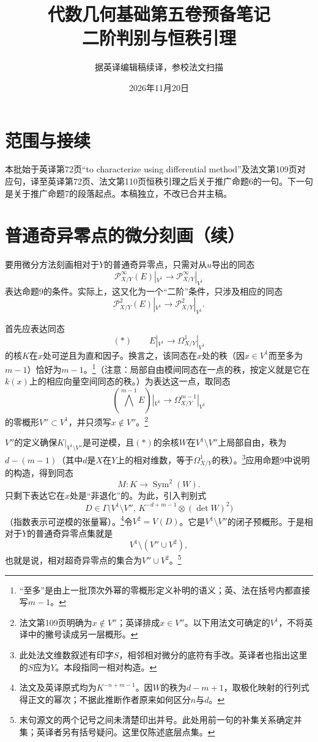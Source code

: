 \documentclass[openany,fontset=fandol]{ctexbook}
\newcommand{\Pp}{\mathcal P}
\newcommand{\Sym}{\operatorname{Sym}}
\begin{document}
\title{代数几何基础第五卷预备笔记\\二阶判别与恒秩引理}
\author{据英译编辑稿续译，参校法文扫描}
\date{2026年11月20日}
\maketitle
\chapter*{范围与接续}
本批始于英译第72页“to characterize using differential method”及法文第109页对应句，译至英译第72页、法文第110页恒秩引理之后关于推广命题6的一句。下一句是关于推广命题7的段落起点。本稿独立，不改已合并主稿。
\chapter*{普通奇异零点的微分刻画（续）}
要用微分方法刻画相对于$Y$的普通奇异零点，只需对从$u$导出的同态
\[
\Pp^\infty_{X/Y}(E)|_{V^1}\longrightarrow
\Pp^\infty_{X/Y}|_{V^1}
\]
表达命题9的条件。实际上，这又化为一个“二阶”条件，只涉及相应的同态
\[
\Pp^2_{X/Y}(E)|_{V^1}\longrightarrow
\Pp^2_{X/Y}|_{V^1}.
\]

首先应表达同态
\[
(*)\qquad E|_{V^1}\longrightarrow\Omega^1_{X/Y}|_{V^1}
\]
的核$K$在$x$处可逆且为直和因子。换言之，该同态在$x$处的秩（因$x\in V^1$而至多为$m-1$）恰好为$m-1$。\footnote{“至多”是由上一批顶次外幂的零概形定义补明的语义；英、法在括号内都直接写$m-1$。}（注意：局部自由模间同态在一点的秩，按定义就是它在$k(x)$上的相应向量空间同态的秩。）为表达这一点，取同态
\[
(\bigwedge^{m-1}E)|_{V^1}\longrightarrow
\Omega^{m-1}_{X/Y}|_{V^1}
\]
的零概形$V''\subset V^1$，并只须写$x\notin V''$。\footnote{法文第109页明确为$x\notin V''$；英译排成$x\in V''$。以下用法文可确定的$V^1$，不将英译中的撇号读成另一层概形。}

$V''$的定义确保$K|_{V^1\setminus V''}$是可逆模，且$(*)$的余核$W$在$V^1\setminus V''$上局部自由，秩为$d-(m-1)$（其中$d$是$X$在$Y$上的相对维数，等于$\Omega^1_{X/Y}$的秩）。\footnote{此处法文维数叙述有印字$S$，相邻相对微分的底符有手改。英译者也指出这里的$S$应为$Y$。本段指同一相对构造。}应用命题9中说明的构造，得到同态
\[
M:K\longrightarrow\Sym^2(W).
\]
只剩下表达它在$x$处是“非退化”的。为此，引入判别式
\[
D\in\Gamma\bigl(V^1\setminus V'',\,
 K^{-d+m-1}\otimes(\det W)^2\bigr)
\]
（指数表示可逆模的张量幂）。\footnote{法文及英译原式均为$K^{-n+m-1}$。因$W$的秩为$d-m+1$，取极化映射的行列式得正文的幂次；不据此推断作者原来如何区分$n$与$d$。}令$V^2=V(D)$。它是$V^1\setminus V''$的闭子预概形。于是相对于$Y$的普通奇异零点集就是
\[
V^1\setminus(V''\cup V^2),
\]
也就是说，相对超奇异零点的集合为$V''\cup V^2$。\footnote{末句源文的两个记号之间未清楚印出并号。此处用前一句的补集关系确定并集；英译者另有括号疑问。这里仅陈述底层点集。}
\end{document}
